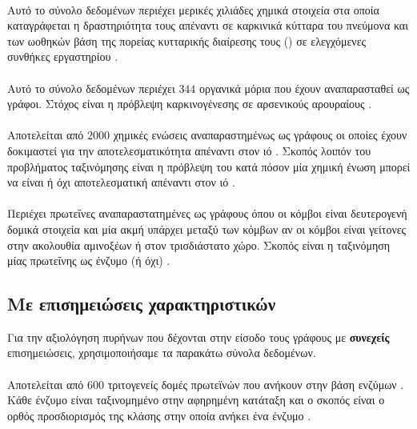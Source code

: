 \paragraph*{} Αυτό το σύνολο δεδομένων περιέχει μερικές χιλιάδες χημικά στοιχεία στα οποία καταγράφεται η δραστηριότητα τους απέναντι σε καρκινικά κύτταρα του πνεύμονα και των ωοθηκών βάση της πορείας κυτταρικής διαίρεσης τους () σε ελεγχόμενες συνθήκες εργαστηρίου \cite{Wale2008}.

\paragraph*{} Αυτό το σύνολο δεδομένων περιέχει $344$ οργανικά μόρια που έχουν αναπαρασταθεί ως γράφοι.
Στόχος είναι η πρόβλεψη καρκινογένεσης σε αρσενικούς αρουραίους \cite{Toivonen2003}.

\paragraph*{} Αποτελείται από $2000$ χημικές ενώσεις αναπαραστημένως ως γράφους οι οποίες έχουν δοκιμαστεί για την αποτελεσματικότητα απέναντι στον ιό . Σκοπός λοιπόν του προβλήματος ταξινόμησης είναι η πρόβλεψη του κατά πόσον μία χημική ένωση μπορεί να είναι ή όχι αποτελεσματική απέναντι στον ιό \cite{Riesen08}.

\paragraph*{} Περιέχει πρωτεΐνες αναπαραστατημένες ως γράφους όπου οι κόμβοι είναι δευτερογενή δομικά στοιχεία και μία ακμή υπάρχει μεταξύ των κόμβων αν οι κόμβοι είναι γείτονες στην ακολουθία αμινοξέων ή στον τρισδιάστατο χώρο.
Σκοπός είναι η ταξινόμηση μίας πρωτεΐνης ως ένζυμο (ή όχι) \cite{borgwardt2005protein}.

\subsection{Με επισημειώσεις χαρακτηριστικών}
\label{ssec:atr}
Για την αξιολόγηση πυρήνων που δέχονται στην είσοδο τους γράφους με \textbf{συνεχείς} επισημειώσεις, χρησιμοποιήσαμε τα παρακάτω σύνολα δεδομένων.

\paragraph*{} Αποτελείται από $600$ τριτογενείς δομές πρωτεϊνών που ανήκουν στην βάση ενζύμων .
Κάθε ένζυμο είναι ταξινομημένο στην αφηρημένη κατάταξη  και ο σκοπός είναι ο ορθός προσδιορισμός της κλάσης στην οποία ανήκει ένα ένζυμο \cite{Borgwardt2005}.

